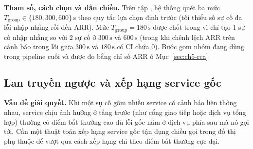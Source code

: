 \textbf{Tham số, cách chọn và dẫn chiếu.} Trên tập , hệ thống quét ba mức $T_{\text{group}} \in \{180, 300, 600\}\,\text{s}$ theo quy tắc lựa chọn định trước (tối thiểu số sự cố đa lỗi nhập nhằng  rồi đến ARR). Mức $T_{\text{group}} = 180\,\text{s}$ được chốt trong  vì chỉ tạo $1$ sự cố nhập nhằng so với $2$ sự cố ở $300\,\text{s}$ và $600\,\text{s}$ (trong khi chênh lệch ARR trên cảnh báo trong lỗi giữa $300\,\text{s}$ và $180\,\text{s}$ có CI chứa $0$). Bước gom nhóm đang dùng trong pipeline cuối và được đo bằng chỉ số ARR ở Mục~\ref{sec:ch5-rca}.

\subsection{Lan truyền ngược và xếp hạng service gốc}
\label{sec:ch4-propagation}

\textbf{Vấn đề giải quyết.} Khi một sự cố gồm nhiều service có cảnh báo liên thông nhau, service chịu ảnh hưởng ở tầng trước (như cổng giao tiếp hoặc dịch vụ tổng hợp) thường có điểm bất thường cao dù lỗi gốc nằm ở dịch vụ phía sau mà nó gọi tới. Cần một thuật toán xếp hạng service gốc tận dụng chiều gọi trong đồ thị phụ thuộc để vượt qua cách xếp hạng chỉ theo điểm bất thường cực đại.

